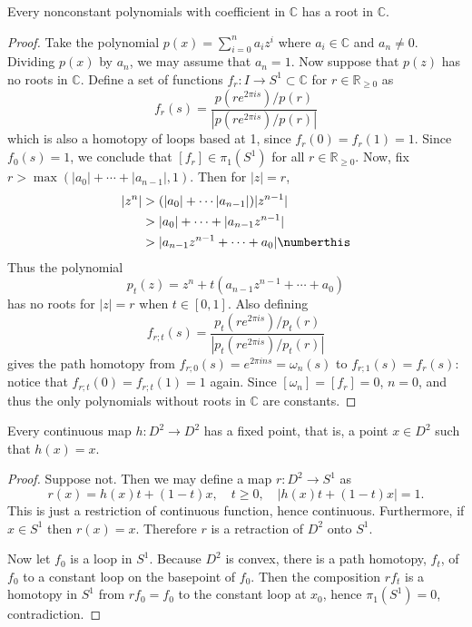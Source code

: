\begin{thm} Every nonconstant polynomials with coefficient in $\mathbb{C}$ has a root in $\mathbb{C}$.
\end{thm}
\begin{proof}
Take the polynomial $p(x)=\sum_{i=0}^n a_iz^i$ where $a_i\in \mathbb{C}$ and $a_n\neq 0$. Dividing $p(x)$ by $a_n$, we may assume that $a_n=1$. Now suppose that $p(z)$ has no roots in $\mathbb{C}$. Define a set of functions $f_r:I\rightarrow S^1\subset \mathbb{C}$ for $r\in \mathbb{R}_{\geq 0}$ as
\begin{equation}
f_r(s)=\frac{p(r e^{2\pi i s})/p(r)}{|p(r e^{2\pi i s})/p(r)|}
\end{equation}
which is also a homotopy of loops based at 1, since $f_r(0)=f_r(1)=1$. Since $f_0(s)=1$, we conclude that $[f_r]\in \pi_1(S^1)$ for all $r\in\mathbb{R}_{\geq 0}$. Now, fix $r>\max(|a_0|+\cdots+|a_{n-1}|,1)$. Then for $|z|=r$,
\begin{align*}
|z^n|&>(|a_0|+\cdots |a_{n-1}|)|z^{n-1}|\\
&>|a_0|+\cdots+|a_{n-1}z^{n-1}|\\
&>|a_{n-1}z^{n-1}+\cdots+a_0|\numberthis
\end{align*}
Thus the polynomial
\begin{equation}
p_t(z)=z^n+t(a_{n-1}z^{n-1}+\cdots+a_0)
\end{equation}
has no roots for $|z|=r$ when $t\in[0,1]$. Also defining
\begin{equation}
f_{r;t}(s)=\frac{p_t(re^{2\pi i s})/p_t(r)}{|p_t(r e^{2\pi i s})/p_t(r)|}
\end{equation}
gives the path homotopy from $f_{r;0}(s)=e^{2\pi i n s}=\omega_n(s)$ to $f_{r;1}(s)=f_r(s)$: notice that $f_{r;t}(0)=f_{r;t}(1)=1$ again. Since $[\omega_n]=[f_r]=0$, $n=0$, and thus the only polynomials without roots in $\mathbb{C}$ are constants. 
\end{proof}

\begin{thm} Every continuous map $h:D^2\rightarrow D^2$ has a fixed point, that is, a point $x\in D^2$ such that $h(x)=x$.
\end{thm}
\begin{proof}
Suppose not. Then we may define a map $r:D^2\rightarrow S^1$ as
\begin{equation}
r(x)=h(x)t+(1-t)x,\quad t\geq 0, \quad |h(x)t+(1-t)x|=1.
\end{equation}
This is just a restriction of continuous function, hence continuous. Furthermore, if $x\in S^1$ then $r(x)=x$. Therefore $r$ is a retraction of $D^2$ onto $S^1$.

Now let $f_0$ is a loop in $S^1$. Because $D^2$ is convex, there is a path homotopy, $f_t$, of $f_0$ to a constant loop on the basepoint of $f_0$. Then the composition $rf_t$ is a homotopy in $S^1$ from $rf_0=f_0$ to the constant loop at $x_0$, hence $\pi_1(S^1)=0$, contradiction.
\end{proof}

